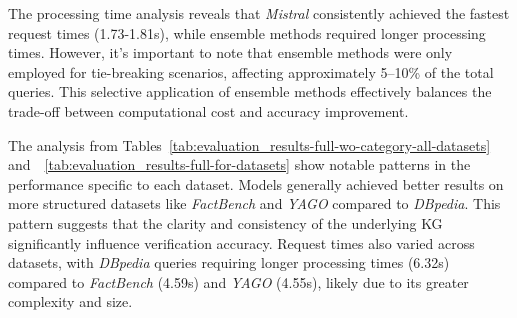The processing time analysis reveals that \textit{Mistral} consistently achieved the fastest request times (1.73-1.81s), while ensemble methods required longer processing times.
However, it's important to note that ensemble methods were only employed for tie-breaking scenarios, affecting approximately 5--10\% of the total queries.
This selective application of ensemble methods effectively balances the trade-off between computational cost and accuracy improvement.

\begin{table}[ht!]
    \noindent
    \centering
    \caption{Statistical analysis of request time per query across FactBench, YAGO, and DBpedia datasets.}
    \label{tab:evaluation_results-full-for-datasets}
\end{table}

The analysis from Tables~\ref{tab:evaluation_results-full-wo-category-all-datasets} and~~\ref{tab:evaluation_results-full-for-datasets} show notable patterns in the performance specific to each dataset.
Models generally achieved better results on more structured datasets like \textit{FactBench} and \textit{YAGO} compared to \textit{DBpedia}.
This pattern suggests that the clarity and consistency of the underlying \ac{KG} significantly influence verification accuracy.
Request times also varied across datasets, with \textit{DBpedia} queries requiring longer processing times (6.32s) compared to \textit{FactBench} (4.59s) and \textit{YAGO} (4.55s), likely due to its greater complexity and size.

